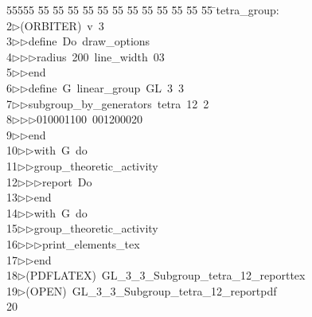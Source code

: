 %
%
\begin{tabbing}
55555 \= 55 \= 55 \= 55 \= 55 \= 55 \= 55 \= 55 \= 55 \= 55 \= 55 \= 55 \= 55 \= \>tetra\_group:\\[0pt]
2\>$\triangleright$\>(ORBITER)\ v\ 3\ \\[0pt]
3\>$\triangleright$\>$\triangleright$\>define\ Do\ draw\_options\ \\[0pt]
4\>$\triangleright$\>$\triangleright$\>$\triangleright$\>radius\ 200\ line\_width\ 03\ \\[0pt]
5\>$\triangleright$\>$\triangleright$\>end\ \\[0pt]
6\>$\triangleright$\>$\triangleright$\>define\ G\ linear\_group\ GL\ 3\ 3\ \\[0pt]
7\>$\triangleright$\>$\triangleright$\>subgroup\_by\_generators\ tetra\ 12\ 2\ \\[0pt]
8\>$\triangleright$\>$\triangleright$\>$\triangleright$\>010001100\ 001200020\ \\[0pt]
9\>$\triangleright$\>$\triangleright$\>end\ \\[0pt]
10\>$\triangleright$\>$\triangleright$\>with\ G\ do\ \\[0pt]
11\>$\triangleright$\>$\triangleright$\>group\_theoretic\_activity\ \\[0pt]
12\>$\triangleright$\>$\triangleright$\>$\triangleright$\>report\ Do\ \\[0pt]
13\>$\triangleright$\>$\triangleright$\>end\ \\[0pt]
14\>$\triangleright$\>$\triangleright$\>with\ G\ do\ \\[0pt]
15\>$\triangleright$\>$\triangleright$\>group\_theoretic\_activity\ \\[0pt]
16\>$\triangleright$\>$\triangleright$\>$\triangleright$\>print\_elements\_tex\ \\[0pt]
17\>$\triangleright$\>$\triangleright$\>end\\[0pt]
18\>$\triangleright$\>(PDFLATEX)\ GL\_3\_3\_Subgroup\_tetra\_12\_reporttex\\[0pt]
19\>$\triangleright$\>(OPEN)\ GL\_3\_3\_Subgroup\_tetra\_12\_reportpdf\\[0pt]
20\>\end{tabbing}

